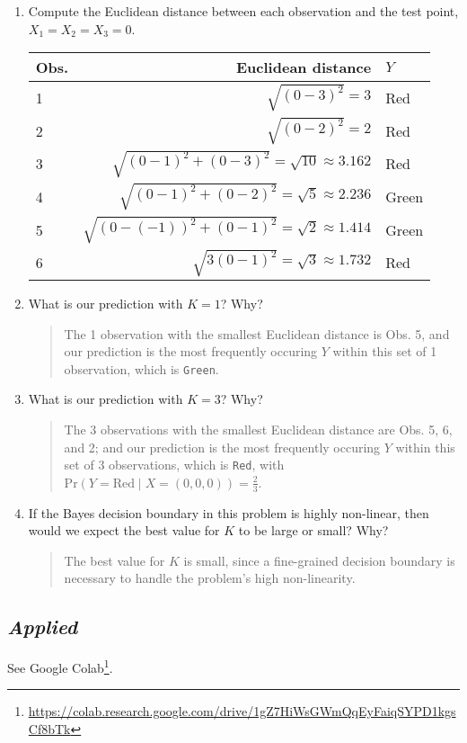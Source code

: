 \documentclass[11pt]{article}
\newenvironment{answer}{
\begin{quote}}{
\end{quote}}
\begin{document}
\begin{enumerate}
    \begin{enumerate}
      \item Compute the Euclidean distance between each observation
        and the test point, $X_1 = X_2 = X_3 = 0$.
        \begin{center}
          \begin{tabular}{l|rl}
            \hline
            Obs. & Euclidean distance & $Y$ \\
            \hline
            1 & $\sqrt{(0-3)^2}=3$ & Red \\
            2 & $\sqrt{(0-2)^2}=2$ & Red \\
            3 & $\sqrt{(0-1)^2 + (0-3)^2} = \sqrt{10} \approx 3.162$ & Red \\
            4 & $\sqrt{(0-1)^2 + (0-2)^2} = \sqrt{5} \approx 2.236$ & Green \\
            5 & $\sqrt{(0-(-1))^2 + (0-1)^2} = \sqrt{2} \approx
            1.414$ & Green \\
            6 & $\sqrt{3(0-1)^2} =\sqrt{3} \approx 1.732$ & Red \\
            \hline
          \end{tabular}
        \end{center}
      \item What is our prediction with $K = 1$? Why?
        \begin{answer}
          The 1 observation with the smallest Euclidean distance is
          Obs. 5, and our prediction is the most frequently occuring
          $Y$ within this set of 1 observation, which is \texttt{Green}.
        \end{answer}
      \item What is our prediction with $K = 3$? Why?
        \begin{answer}
          The 3 observations with the smallest Euclidean distance are
          Obs. 5, 6, and 2; and our prediction is the most frequently
          occuring $Y$ within this set of 3 observations, which is
          \texttt{Red}, with $\text{Pr}(Y=\text{Red} \mid
          X=(0,0,0))=\frac{2}{3}$.
        \end{answer}
      \item If the Bayes decision boundary in this problem is highly
        non-linear, then would we expect the best value for $K$ to be
        large or small? Why?
        \begin{answer}
            The best value for $K$ is small, since a fine-grained decision boundary is necessary to handle the problem's high non-linearity.
        \end{answer}
    \end{enumerate}

\end{enumerate}

\subsection*{\textit{Applied}}

See Google Colab\footnote{\url{https://colab.research.google.com/drive/1gZ7HiWsGWmQqEyFaiqSYPD1kgsCf8bTk}}.
\end{document}
